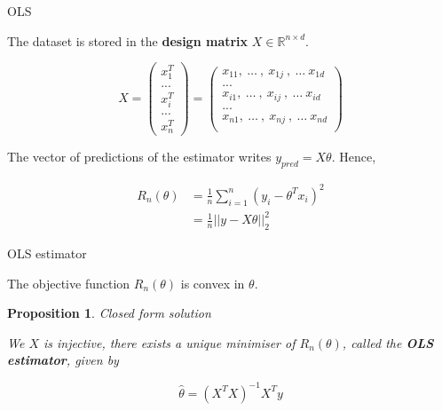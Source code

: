 \documentclass[usenames,dvipsnames]{beamer}
\newtheorem*{proposition}{Proposition}
\begin{document}
\begin{frame}{OLS}

The dataset is stored in the \textbf{{design matrix}} $X\in \mathbb{R}^{n\times d}$.

\begin{equation*}
X=
\begin{pmatrix}
x_{1}^T\\
...\\
x_{i}^T\\
...\\
x_{n}^T
\end{pmatrix}
=
\begin{pmatrix}
    x_{11}, \:\dots\:,\: x_{1j}\:, \:\dots\: x_{1d}\\
...\\
    x_{i1}, \:\dots\:,\: x_{ij}\:, \:\dots\: x_{id}\\
...\\
    x_{n1}, \:\dots\:,\: x_{nj}\:, \:\dots\: x_{nd}\\
\end{pmatrix}
\end{equation*}

    The vector of predictions of the estimator writes $y_{pred} = X\theta$.  Hence,

\begin{equation*}
    \begin{aligned}
	R_n(\theta) &= \frac{1}{n} \sum^{n}_{i=1} (y_i-\theta^Tx_i)^2\\
	&= \frac{1}{n} ||y-X\theta||_2^2
    \end{aligned}
\end{equation*}
    
\end{frame}

\begin{frame}{OLS estimator}

    The objective function $R_n(\theta)$ is convex in $\theta$.

\begin{proposition}{Closed form solution}
    
    We $X$ is injective, there exists a unique minimiser of $R_n(\theta)$, called the \textbf{{OLS estimator}}, given by

    \begin{equation}
	\label{def:ols}
	\hat{ \theta}= (X^TX)^{-1}X^Ty
    \end{equation}
\end{proposition}
    
\end{frame}
\end{document}
